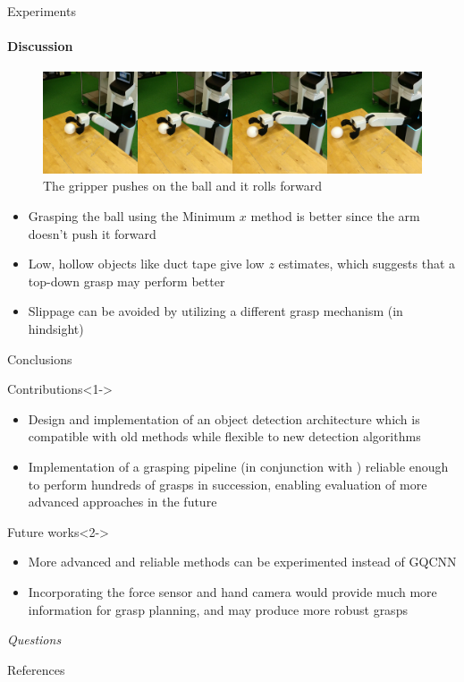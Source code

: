 \documentclass{beamer}
\begin{document}
\begin{frame}{Experiments}
\framesubtitle{Discussion}%
    \begin{figure}[t]
    \centering
    \includegraphics[width=0.8\linewidth]{grasp_ball_fail}
    \caption{\small The gripper pushes on the ball and it rolls forward}
    \label{fig:grasp_ball_fail}
    \end{figure}
    \begin{itemize}
        \small
        \item Grasping the ball using the Minimum $ x $ method is better since the arm doesn't push it forward
        \item Low, hollow objects like duct tape give low $ z $ estimates, which suggests that a top-down grasp may
        perform better
        \item Slippage can be avoided by utilizing a different grasp mechanism (in hindsight)
    \end{itemize}
\end{frame}

\begin{frame}{Conclusions}
\scriptsize
\begin{exampleblock}{Contributions}<1->
    \begin{itemize}
        \item Design and implementation of an object detection architecture which is compatible with old methods while
        flexible to new detection algorithms
        \item Implementation of a grasping pipeline (in conjunction with \cite{Padalkar2018}) reliable enough to
            perform hundreds of grasps in succession, enabling evaluation of more advanced approaches in the future
    \end{itemize}
\end{exampleblock}
\begin{exampleblock}{Future works}<2->
    \begin{itemize}
        \item More advanced and reliable methods can be experimented instead of GQCNN
        \item Incorporating the force sensor and hand camera would provide much more information for grasp planning,
            and may produce more robust grasps
    \end{itemize}
\end{exampleblock}
\normalsize
\end{frame}

\begin{frame}{}
\begin{center}
    \Huge \emph{Questions}
\end{center}
\end{frame}

\begin{frame}[allowframebreaks]{References}
    \printbibliography
\end{frame}
\end{document}
